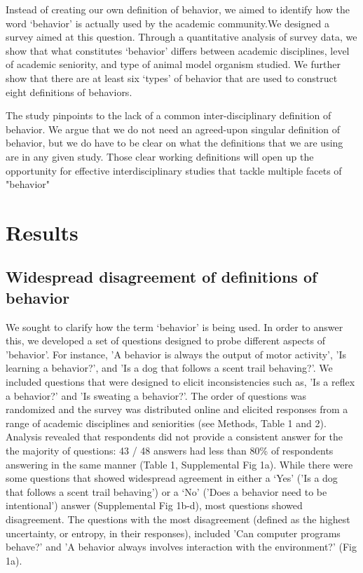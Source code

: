 \documentclass[a4paper, 11pt]{article}
\begin{document}
Instead of creating our own definition of behavior, we aimed to identify how the word `behavior' is actually used by the academic community.We designed a survey aimed at this question. Through a quantitative analysis of survey data, we show that what constitutes `behavior' differs between academic disciplines, level of academic seniority, and type of animal model organism studied. We further show that there are at least six `types' of behavior that are used to construct eight definitions of behaviors. 

The study pinpoints to the lack of a common inter-disciplinary definition of behavior. We argue that we do not need an agreed-upon singular definition of behavior, but we do have to be clear on what the definitions that we are using are in any given study. Those clear working definitions will open up the opportunity for effective interdisciplinary studies that tackle multiple facets of "behavior"

\vspace{24pt}
\section*{Results}

\subsection*{Widespread disagreement of definitions of behavior}
We sought to clarify how the term `behavior' is being used. In order to answer this, we developed a set of questions designed to probe different aspects of 'behavior'. For instance, 'A behavior is always the output of motor activity', 'Is learning a behavior?', and 'Is a dog that follows a scent trail behaving?'. We included questions that were designed to elicit inconsistencies such as, 'Is a reflex a behavior?' and 'Is sweating a behavior?'. The order of questions was randomized and the survey was distributed online and elicited responses from a range of academic disciplines and seniorities (see Methods, Table 1 and 2). Analysis revealed that respondents did not provide a consistent answer for the the majority of questions: 43 / 48 answers had less than 80\% of respondents answering in the same manner (Table 1, Supplemental Fig 1a). While there were some questions that showed widespread agreement in either a `Yes' ('Is a dog that follows a scent trail behaving') or a `No' ('Does a behavior need to be intentional') answer (Supplemental Fig 1b-d), most questions showed disagreement. The questions with the most disagreement (defined as the highest uncertainty, or entropy, in their responses), included 'Can computer programs behave?' and 'A behavior always involves interaction with the environment?' (Fig 1a).
\end{document}
